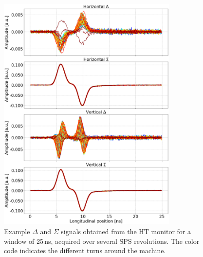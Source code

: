 \begin{figure}[!h]
   \centering         
   \includegraphics[width=0.8\textwidth]{images/Ch4/HT_1D__20180530_114730exampleAcq_4thesis_turnsStart0_Stop6000_step100.png}
       \caption{Example $\Delta$ and $\Sigma$ signals obtained from the HT monitor for a window of 25\,ns, acquired over several SPS revolutions. The color code indicates the different turns around the machine.}
       \label{fig:HT_example_acq_multTurns}
\end{figure}

